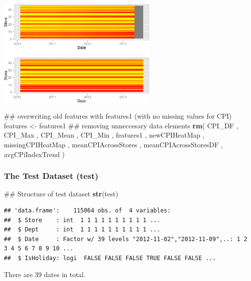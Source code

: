 \documentclass[]{article}
\newenvironment{Shaded}{\begin{snugshade}}{\end{snugshade}}
\newcommand{\KeywordTok}[1]{\textcolor[rgb]{0.13,0.29,0.53}{\textbf{{#1}}}}
\newcommand{\StringTok}[1]{\textcolor[rgb]{0.31,0.60,0.02}{{#1}}}
\newcommand{\NormalTok}[1]{{#1}}
\begin{document}
\includegraphics[width=300px]{PredictingWeeklySalesAtWalmart_files/figure-latex/plottingNewCPI-1}

\begin{Shaded}
\begin{Highlighting}[]
\NormalTok{## overwriting old features with features1 (with no missing values for CPI)}
\NormalTok{features <-}\StringTok{ }\NormalTok{features1}
\NormalTok{## removing unneccesary data elements}
\KeywordTok{rm}\NormalTok{( CPI_DF , CPI_Max , CPI_Mean , CPI_Min , }
    \NormalTok{features1 , newCPIHeatMap , missingCPIHeatMap ,}
    \NormalTok{meanCPIAcrossStores , meanCPIAcrossStoresDF , avgCPiIndexTrend )}
\end{Highlighting}
\end{Shaded}

\subsubsection{The Test Dataset (test)}\label{the-test-dataset-test}

\begin{Shaded}
\begin{Highlighting}[]
\NormalTok{## Structure of test dataset}
\KeywordTok{str}\NormalTok{(test)}
\end{Highlighting}
\end{Shaded}

\begin{verbatim}
## 'data.frame':    115064 obs. of  4 variables:
##  $ Store    : int  1 1 1 1 1 1 1 1 1 1 ...
##  $ Dept     : int  1 1 1 1 1 1 1 1 1 1 ...
##  $ Date     : Factor w/ 39 levels "2012-11-02","2012-11-09",..: 1 2 3 4 5 6 7 8 9 10 ...
##  $ IsHoliday: logi  FALSE FALSE FALSE TRUE FALSE FALSE ...
\end{verbatim}

There are 39 dates in total.

\begin{Shaded}
\end{Shaded}
\end{document}
